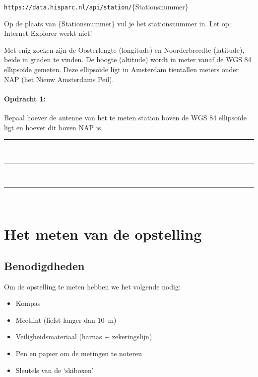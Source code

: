 \texttt{\small{https://data.hisparc.nl/api/station/}}{\small{\{Stationsnummer\}}}

Op de plaats van \{Stationsnummer\} vul je het stationsnummer in. Let
op: Internet Explorer werkt niet!

Met enig zoeken zijn de Oosterlengte (longitude) en Noorderbreedte
(latitude), beide in graden te vinden. De hoogte (altitude) wordt in
meter vanaf de WGS 84 ellipsoïde gemeten. Deze ellipsoïde ligt in
Amsterdam tientallen meters onder NAP (het Nieuw Amsterdams Peil).

\begin{minipage}[t]{1\columnwidth}%

\paragraph{Opdracht 1:}

Bepaal hoever de \gps antenne van het te meten station boven de WGS 84
ellipsoïde ligt en hoever dit boven NAP is.

\begin{center}
    \rule{\textwidth}{0.3mm}\\
    \rule{\textwidth}{0.3mm}\\
    \rule{\textwidth}{0.3mm}\\
\end{center}

\end{minipage}


\section{Het meten van de opstelling}


\subsection{Benodigdheden}

Om de opstelling te meten hebben we het volgende nodig:

\begin{itemize}
    \item Kompas
    \item Meetlint (liefst langer dan \SI{10}{\meter})
    \item Veiligheidsmateriaal (harnas + zekeringslijn)
    \item Pen en papier om de metingen te noteren
    \item Sleutels van de `skiboxen'
\end{itemize}

